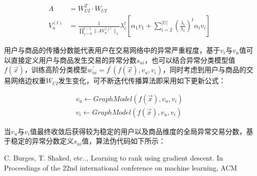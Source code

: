 \begin{equation}
\begin{aligned}
A & = W_{UI}^T \cdot W_{UI} \\
V_u^{(t)} & = \frac{1}{\prod_{j=0}^{t-1}\lVert AV_u^{(j)} \rVert_1}\lambda_i^t[\alpha_1v_1+\sum_{i=2}^{\lvert U \rvert}(\frac{\lambda_i}{\lambda_1})^t\alpha_iv_i]
\end{aligned}
\end{equation}

用户与商品的传播分数能代表用户在交易网络中的异常严重程度，基于$v_i$与$v_u$值可以直接定义用户与商品发生交易的异常分数$s_{ui}$，也可以结合异常分类模型值$f(\vec x)$，训练高阶分类模型$w^{'}_{ui}=f^{'}(f(\vec x), v_u, v_i)$，同时考虑到用户与商品的交易网络边权重$W_{UI}$发生变化，可不断迭代传播算法即采用如下更新公式：

\begin{equation}
\begin{aligned}
v_u \leftarrow GraphModel(f(\vec x), v_u, v_i) \\
v_i \leftarrow GraphModel(f(\vec x), v_u, v_i)
\end{aligned}
\end{equation}

当$v_u$与$v_i$值最终收敛后获得较为稳定的用户以及商品维度的全局异常交易分数，基于稳定的异常分数定义$s_{ui}$值，算法伪代码如下所示：



\begin{thebibliography}{99}
 C. Burges, T. Shaked, etc.., Learning to rank 
using gradient descent. In Proceedings of the 22nd international 
conference on machine learning, ACM
\end{thebibliography}

 
